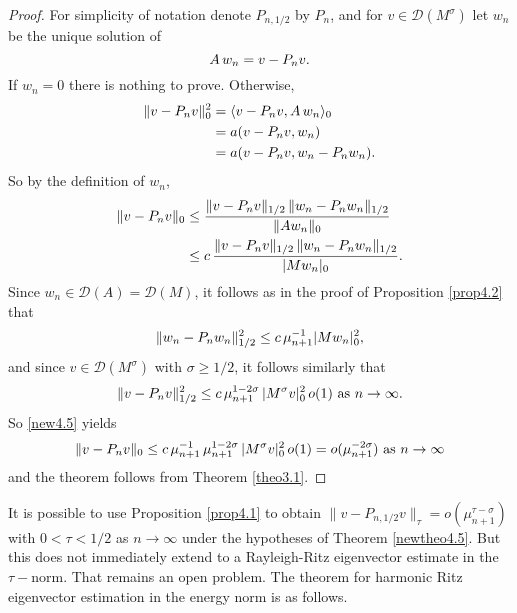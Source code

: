 \documentclass[final]{siamltex}
\numberwithin{equation}{section}
\begin{document}
\begin{proof}
For simplicity of notation denote $P_{n, 1/2}$ by $P_n$, and for $v \in \mathcal{D}(M^{\sigma})$ let $w_n$ be the unique solution of \begin{equation} \notag
A \, w_n = v- P_n v.
\end{equation}
If $w_n=0$ there is nothing to prove. Otherwise,
\begin{align}
\|v- P_n v\|_0^2 &=\langle v - P_n v, A \, w_n\rangle_0 \notag \\
&= a(v - P_n v, w_n) \notag \\
&=a(v- P_n v, w_n - P_n w_n). \notag
\end{align}
So by the definition of $w_n$,
\begin{align} \label{new4.5}
\|v- P_n v\|_0 &\le \frac{\|v-P_n v\|_{1/2} \, \|w_n - P_n w_n\|_{1/2}}
{\|A w_n\|_0} \notag \\
&\le c \, \frac{\|v-P_n v\|_{1/2} \, \|w_n - P_n w_n\|_{1/2}}
{|M w_n|_0}.
\end{align}
Since $w_n \in \mathcal{D}(A)=\mathcal{D}(M)$, it follows as in the proof of Proposition \ref{prop4.2} that
\begin{equation} \notag
\|w_n - P_n w_n\|_{1/2}^2 \le c \, \mu_{n+1}^{-1} |M w_n |_0^2,
\end{equation}
and since $v \in \mathcal{D}(M^{\sigma})$ with $\sigma \ge 1/2$, it follows similarly that
\begin{equation} \notag
\|v - P_n v\|_{1/2}^2 \le c \, \mu_{n+1}^{1-2 \sigma} \, |M^{\sigma} v|_0^2 \, o(1) \text{ as } n\to \infty.
\end{equation}
So \eqref{new4.5} yields
\begin{equation} \notag
\|v- P_n v\|_0 \le c\, \mu_{n+1}^{-1} \, \mu_{n+1}^{1- 2 \sigma} \,
|M^{\sigma} v|_0^2 \, o(1) = o(\mu_{n+1}^{-2 \sigma}) \text{ as } n \to
\infty
\end{equation}
and the theorem follows from Theorem \ref{theo3.1}.
\hfill \end{proof}

It is possible to use Proposition \ref{prop4.1} to obtain $\|v - P_{n, 1/2} v\|_{\tau} = o(\mu_{n+1}^{\tau-\sigma})$ with $0<\tau <1/2$ as $n \to \infty$ under the hypotheses of Theorem \ref{newtheo4.5}. But this does not immediately extend to a Rayleigh-Ritz eigenvector estimate in the $\tau-$norm. That remains an open problem. The theorem for harmonic Ritz eigenvector estimation in the energy norm is as follows.
\end{document}
